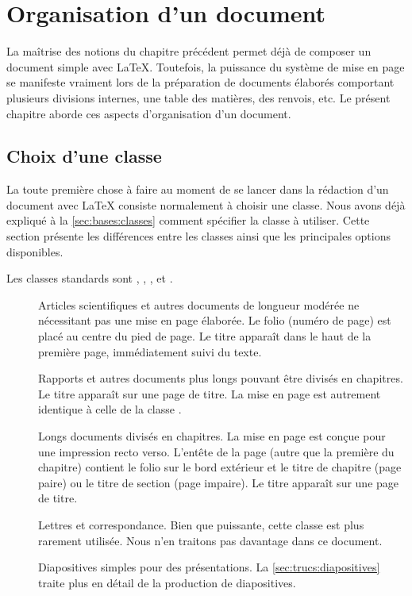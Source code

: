 \chapter{Organisation d'un document}
\label{chap:organisation}

La maîtrise des notions du chapitre précédent permet déjà de composer
un document simple avec {\LaTeX}. Toutefois, la puissance du système
de mise en page se manifeste vraiment lors de la préparation de
documents élaborés comportant plusieurs divisions internes, une table
des matières, des renvois, etc. Le présent chapitre aborde ces aspects
d'organisation d'un document.

\section{Choix d'une classe}
\label{sec:organisation:classe}

La toute première chose à faire au moment de se lancer dans la
rédaction d'un document avec {\LaTeX} consiste normalement à choisir
une classe. Nous avons déjà expliqué à la \autoref{sec:bases:classes}
comment spécifier la classe à utiliser. Cette section présente les
différences entre les classes ainsi que les principales options
disponibles.

Les classes standards sont , ,
,  et .

\begin{description}
\item[\normalfont{}] Articles scientifiques et autres
  documents de longueur modérée ne nécessitant pas une mise en page
  élaborée. Le folio (numéro de page) est placé au centre du pied de
  page. Le titre apparaît dans le haut de la première page,
  immédiatement suivi du texte.
\item[\normalfont{}] Rapports et autres documents plus
  longs pouvant être divisés en chapitres. Le titre apparaît sur une
  page de titre. La mise en page est autrement identique à celle de la
  classe .
\item[\normalfont{}] Longs documents divisés en chapitres.
  La mise en page est conçue pour une impression recto verso. L'entête
  de la page (autre que la première du chapitre) contient le folio sur
  le bord extérieur et le titre de chapitre (page paire) ou le titre
  de section (page impaire). Le titre apparaît sur une page de titre.
\item[\normalfont{}] Lettres et correspondance. Bien que
  puissante, cette classe est plus rarement utilisée. Nous n'en traitons
  pas davantage dans ce document.
\item[\normalfont{}] Diapositives simples pour des
  présentations. La \autoref{sec:trucs:diapositives} traite plus en
  détail de la production de diapositives.
\end{description}

